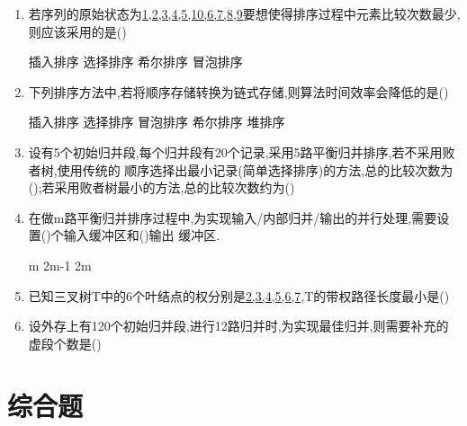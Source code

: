 \documentclass[12pt, a4paper, oneside, UTF8]{ctexbook}
\begin{document}
\begin{enumerate}
    \item 若序列的原始状态为\underline{1,2,3,4,5,10,6,7,8,9}要想使得排序过程中元素比较次数最少,则应该采用的是()
    \begin{choices}
        \task 插入排序 
        \task 选择排序 
        \task 希尔排序 
        \task 冒泡排序 
    \end{choices}

    \item \bl 下列排序方法中,若将顺序存储转换为链式存储,则算法时间效率会降低的是() 
    \begin{choices}[3]
        \task 插入排序 
        \task 选择排序
        \task 冒泡排序
        \task 希尔排序 
        \task 堆排序 
    \end{choices}

    \item 设有5个初始归并段,每个归并段有20个记录,采用5路平衡归并排序,若不采用败者树,使用传统的
    顺序选择出最小记录(简单选择排序)的方法,总的比较次数为();若采用败者树最小的方法,总的比较次数约为() 
    \begin{choices}
    \end{choices}

    \item 在做m路平衡归并排序过程中,为实现输入/内部归并/输出的并行处理,需要设置()个输入缓冲区和()输出
    缓冲区. 
    \begin{choices}
        \task m
        \task 2m-1
        \task 2m
    \end{choices}

    \item \bl 已知三叉树T中的6个叶结点的权分别是\underline{2,3,4,5,6,7},T的带权路径长度最小是() 
    \begin{choices}
    \end{choices}

    \item \bl 设外存上有120个初始归并段,进行12路归并时,为实现最佳归并,则需要补充的虚段个数是() 
    \begin{choices}
    \end{choices}



\end{enumerate}
\section{综合题}
\ifx\allfiles\undefined
\end{document}
